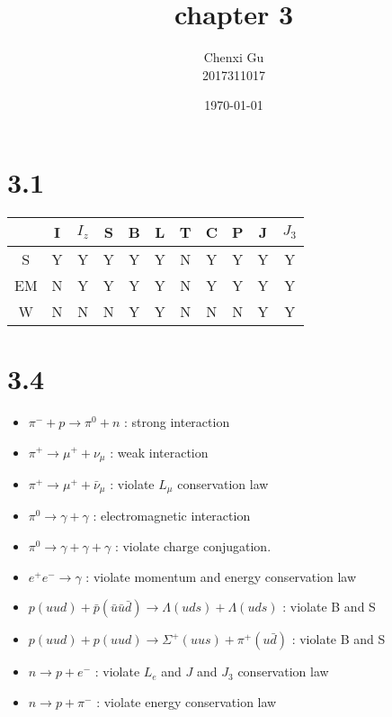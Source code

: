 \documentclass{article}
\begin{document}
\begin{CJK*}{GBK}{song}

\pagestyle{fancy}  
\fancyhead{} %
\renewcommand{\headrulewidth}{0.4pt}  
\renewcommand{\footrulewidth}{0.4pt} 



\title {chapter 3}
\author{Chenxi Gu\\2017311017}

\date{\today}

\maketitle

\section{3.1}
\begin{tabular}{|c|c|c|c|c|c|c|c|c|c|c|}
\hline  
     & I & $I_z$ & S & B & L & T & C & P & J & $J_3$\\
\hline  
S  & Y & Y & Y & Y & Y & N & Y & Y & Y & Y\\
\hline %
EM  & N & Y & Y & Y & Y & N & Y & Y & Y & Y \\
\hline
W  & N & N & N & Y & Y & N & N & N & Y & Y\\
\hline
\end{tabular}

\section{3.4}

\begin{itemize}
\item $\pi^-+p\rightarrow\pi^0+n$  :  strong interaction
\item $\pi^+\rightarrow\mu^++\nu_{\mu}$  :  weak interaction
\item $\pi^+\rightarrow\mu^++\bar{\nu}_{\mu}$  :  violate $L_{\mu}$ conservation law
\item $\pi^0\rightarrow \gamma+\gamma$  :  electromagnetic interaction
\item $\pi^0\rightarrow \gamma+\gamma+\gamma$  :  violate charge conjugation.
\item $e^+e^-\rightarrow \gamma$  :  violate momentum and energy conservation law
\item $p(uud)+\bar{p}(\bar{u}\bar{u}\bar{d})\rightarrow \Lambda(uds)+\Lambda(uds)$  :  violate B and S
\item $p(uud)+p(uud)\rightarrow\Sigma^+(uus)+\pi^+(u\bar{d})$  :  violate B and S
\item $n\rightarrow p+e^-$  :  violate $L_e$ and $J$ and $J_3$ conservation law
\item $n\rightarrow p+\pi^-$  :  violate energy conservation law
\end{itemize}



\end{CJK*}
\end{document}
